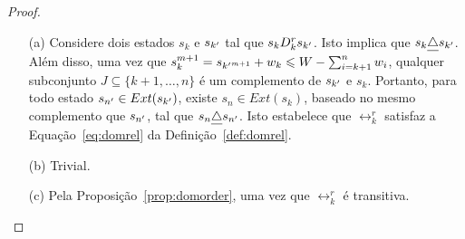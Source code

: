\begin{proof}
  \noindent
  \begin{enumerate}
    \item[(a)]{
      Considere dois estados $s_k$ e $s_{{k'}}$ tal que $s_k D_k^r s_{{k'}}$.
      Isto implica que $s_k \underline{\triangle} s_{{k'}}$.
      Além disso, uma vez que
      $s_k^{m+1} = s_{{k'}^{m+1}} + w_k \leqslant W - \sum_{i=k+1}^n w_i$,
      qualquer subconjunto $J \subseteq \{k+1, \ldots, n\}$ é um complemento
      de $s_{{k'}}$ e $s_k$.
      Portanto, para todo estado $s_{{n'}} \in Ext(s_{{k'}})$,
      existe $s_n \in Ext(s_k)$, baseado no mesmo complemento que $s_{{n'}}$,
      tal que $s_n \underline{\triangle} s_{{n'}}$.
      Isto estabelece que $\rel_k^r$ satisfaz a Equação~\ref{eq:domrel} da
      Definição~\ref{def:domrel}. }
    \item[(b)]{Trivial.}
    \item[(c)]{Pela Proposição~\ref{prop:domorder}, uma vez que $\rel_k^r$ é transitiva.}
  \end{enumerate}
\end{proof}
